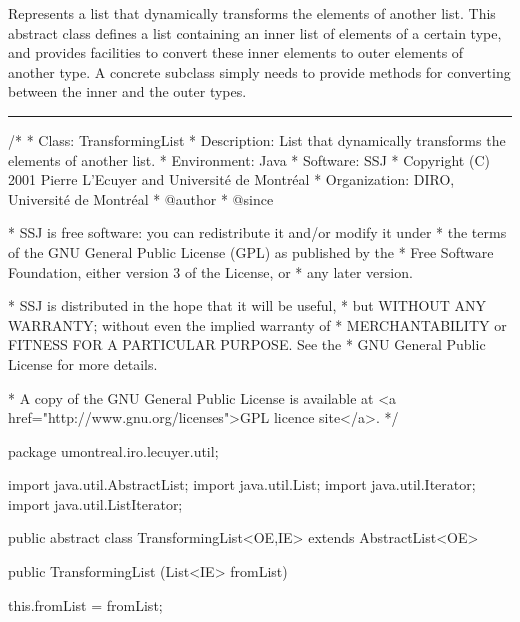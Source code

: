 
Represents a list that dynamically transforms the elements 
of another list.
This abstract class defines a list
containing an inner list of elements of a certain type,
and provides facilities to convert these
inner elements to outer elements of another
type.
A concrete subclass simply needs to provide
methods for converting between the inner
and the outer types.\begin{htmlonly}
\end{htmlonly}


\bigskip\hrule

\begin{code}
\begin{hide}
/*
 * Class:        TransformingList
 * Description:  List that dynamically transforms the elements of another list.
 * Environment:  Java
 * Software:     SSJ 
 * Copyright (C) 2001  Pierre L'Ecuyer and Université de Montréal
 * Organization: DIRO, Université de Montréal
 * @author       
 * @since

 * SSJ is free software: you can redistribute it and/or modify it under
 * the terms of the GNU General Public License (GPL) as published by the
 * Free Software Foundation, either version 3 of the License, or
 * any later version.

 * SSJ is distributed in the hope that it will be useful,
 * but WITHOUT ANY WARRANTY; without even the implied warranty of
 * MERCHANTABILITY or FITNESS FOR A PARTICULAR PURPOSE.  See the
 * GNU General Public License for more details.

 * A copy of the GNU General Public License is available at
   <a href="http://www.gnu.org/licenses">GPL licence site</a>.
 */
\end{hide}
package umontreal.iro.lecuyer.util;\begin{hide}

import java.util.AbstractList;
import java.util.List;
import java.util.Iterator;
import java.util.ListIterator;
\end{hide}


public abstract class TransformingList<OE,IE> extends AbstractList<OE>\begin{hide} {
   private List<IE> fromList;
\end{hide}

   public TransformingList (List<IE> fromList)\begin{hide} {
      this.fromList = fromList;
   }\end{hide}
\end{code}

